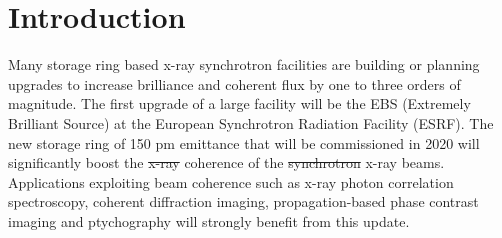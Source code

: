 \documentclass{iucr}              %
\begin{document}
     
\section{Introduction}


Many storage ring based x-ray synchrotron facilities are building or planning upgrades to increase brilliance and coherent flux by one to three orders of magnitude.  The first upgrade of a large facility will be the EBS (Extremely Brilliant Source) \cite{orangebook} at the European Synchrotron Radiation Facility (ESRF). The new storage ring of 150 pm emittance that will be commissioned in 2020 will significantly boost the  {\color{green}\sout{x-ray}} coherence of the  {\color{green}\sout{synchrotron} x-ray} beams. Applications exploiting beam coherence such as x-ray photon correlation spectroscopy, coherent diffraction imaging, propagation-based phase contrast imaging and ptychography will strongly benefit from this update.  
\end{document}
